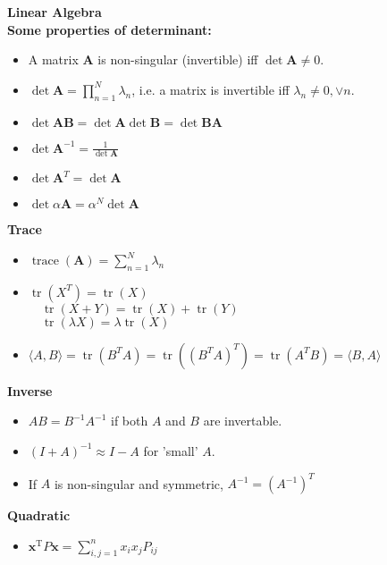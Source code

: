 {\LARGE \textbf{Linear Algebra}}\\

\textbf{Some properties of determinant:}

\begin{itemize}

\item A matrix $\mathbf{A}$ is non-singular (invertible) iff $\operatorname{det} \mathbf{A} \neq 0$.
\item
$\operatorname{det} \mathbf{A}=\prod_{n=1}^{N} \lambda_{n}$, i.e. a matrix is invertible iff $\lambda_{n} \neq 0, \vee n$.
\item $\operatorname{det} \mathbf{A B}=\operatorname{det} \mathbf{A} \operatorname{det} \mathbf{B}=\operatorname{det} \mathbf{BA}$
\item $\operatorname{det} \mathbf{A}^{-1}=\frac{1}{\operatorname{det} \mathbf{A}}$
\item $\operatorname{det} \mathbf{A}^{T}=\operatorname{det} \mathbf{A}$
\item
$\operatorname{det} \alpha \mathbf{A}=\alpha^{N} \operatorname{det} \mathbf{A}$





\end{itemize}


\textbf{Trace}
\begin{itemize}
\item $\operatorname{trace}(\mathbf{A})=\sum_{n=1}^{N} \lambda_{n}$

\item
$\operatorname{tr}\left(X^{T}\right)=\operatorname{tr}(X)$\\
$\quad \operatorname{tr}(X+Y)=\operatorname{tr}(X)+\operatorname{tr}(Y)$\\$ \quad \operatorname{tr}(\lambda X)=\lambda \operatorname{tr}(X)$
\item $\langle A, B\rangle=\operatorname{tr}\left(B^{T} A\right)=\operatorname{tr}\left(\left(B^{T} A\right)^{T}\right)=\operatorname{tr}\left(A^{T} B\right)=\langle B, A\rangle$

\end{itemize}

\textbf{Inverse}
\begin{itemize}
    \item $AB = {B^{ - 1}}{A^{ - 1}}$ if both $A$ and $B$ are invertable.
    \item $(I+A)^{-1} \approx I-A$ for 'small' $A$.
    \item If $A$ is non-singular and symmetric, $A^{-1}=\left(A^{-1}\right)^{T}$
\end{itemize}


\textbf{Quadratic}

\begin{itemize}

\item $\bm{x}^{\mathrm{T}} P \bm{x}=\sum_{i, j=1}^{n} x_{i} x_{j} P_{i j}$


\end{itemize}




